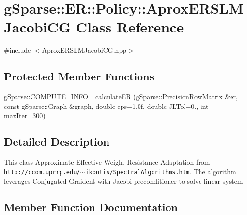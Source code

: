 \hypertarget{classg_sparse_1_1_e_r_1_1_policy_1_1_aprox_e_r_s_l_m_jacobi_c_g}{}\section{g\+Sparse\+:\+:ER\+:\+:Policy\+:\+:Aprox\+E\+R\+S\+L\+M\+Jacobi\+CG Class Reference}
\label{classg_sparse_1_1_e_r_1_1_policy_1_1_aprox_e_r_s_l_m_jacobi_c_g}


{\ttfamily \#include $<$Aprox\+E\+R\+S\+L\+M\+Jacobi\+C\+G.\+hpp$>$}

\subsection*{Protected Member Functions}
\begin{DoxyCompactItemize}
\item 
g\+Sparse\+::\+C\+O\+M\+P\+U\+T\+E\+\_\+\+I\+N\+FO \mbox{\hyperlink{classg_sparse_1_1_e_r_1_1_policy_1_1_aprox_e_r_s_l_m_jacobi_c_g_a0174f484153579201e058996a3d19564}{\+\_\+calculate\+ER}} (g\+Sparse\+::\+Precision\+Row\+Matrix \&er, const g\+Sparse\+::\+Graph \&graph, double eps=1.\+0f, double J\+L\+Tol=0., int max\+Iter=300)
\end{DoxyCompactItemize}


\subsection{Detailed Description}
This class Approximate Effective Weight Resistance Adaptation from \href{http://ccom.uprrp.edu/~ikoutis/SpectralAlgorithms.htm}{\tt http\+://ccom.\+uprrp.\+edu/$\sim$ikoutis/\+Spectral\+Algorithms.\+htm}. The algorithm leverages Conjugated Graident with Jacobi preconditioner to solve linear system 

\subsection{Member Function Documentation}
\mbox{\label{classg_sparse_1_1_e_r_1_1_policy_1_1_aprox_e_r_s_l_m_jacobi_c_g_a0174f484153579201e058996a3d19564}} 
